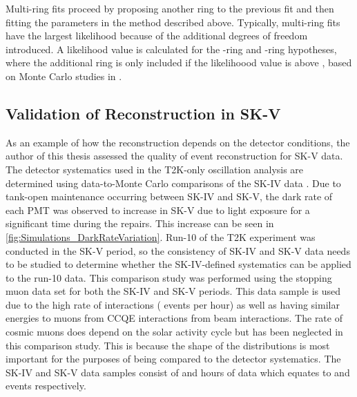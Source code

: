 Multi-ring fits proceed by proposing another ring to the previous fit and then fitting the parameters in the method described above. Typically, multi-ring fits have the largest likelihood because of the additional degrees of freedom introduced. A likelihood value is calculated for the -ring and -ring hypotheses, where the additional ring is only included if the likelihoood value is above , based on Monte Carlo studies in \cite{Tobayama:2016dsi}.

\subsection{Validation of Reconstruction in SK-V}
\label{sec:Simulation_ReconstructionInSKV}


As an example of how the reconstruction depends on the detector conditions, the author of this thesis assessed the quality of \fq event reconstruction for SK-V data. The detector systematics used in the T2K-only oscillation analysis are determined using data-to-Monte Carlo comparisons of the SK-IV data \cite{t2k_tn_399}. Due to tank-open maintenance occurring between SK-IV and SK-V, the dark rate of each PMT was observed to increase in SK-V due to light exposure for a significant time during the repairs. This increase can be seen in \autoref{fig:Simulations_DarkRateVariation}. Run-10 of the T2K experiment was conducted in the SK-V period, so the consistency of SK-IV and SK-V data needs to be studied to determine whether the SK-IV-defined systematics can be applied to the run-10 data. This comparison study was performed using the stopping muon data set for both the SK-IV and SK-V periods. This data sample is used due to the high rate of interactions ( events per hour) as well as having similar energies to muons from CCQE \quickmath{\nu_{\mu}} interactions from beam interactions. The rate of cosmic muons does depend on the solar activity cycle \cite{Maghrabi2021} but has been neglected in this comparison study. This is because the shape of the distributions is most important for the purposes of being compared to the detector systematics. The SK-IV and SK-V data samples consist of  and  hours of data which equates to  and  events respectively.

